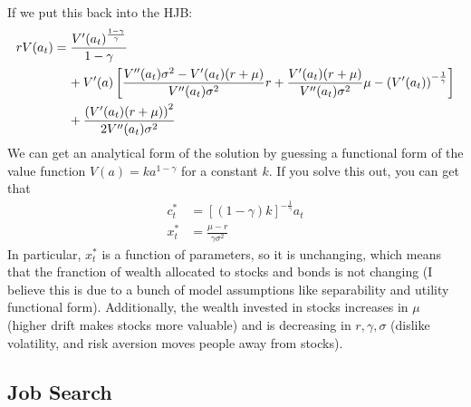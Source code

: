 \documentclass[12pt]{article}
\begin{document}
\begin{itemize}
\[\begin{split}
    \end{split}\]
    If we put this back into the HJB:
    \[\begin{split}
        rV(a_t) &= \frac{V'(a_t)^{\frac{1-\gamma}{\gamma}}}{1-\gamma}\\
        &\hspace{4mm}+ V'(a)\left[\frac{V''(a_t)\sigma^2-V'(a_t)(r+\mu)}{V''(a_t)\sigma^2}r +\frac{V'(a_t)(r+\mu)}{V''(a_t)\sigma^2}\mu -\left(V'(a_t)\right)^{-\frac{1}{\gamma}} \right]\\
        &\hspace{4mm}+ \frac{\left(V'(a_t)(r+\mu)\right)^2}{2V''(a_t)\sigma^2}
    \end{split}\]
    We can get an analytical form of the solution by guessing a functional form of the value function $V(a) = ka^{1-\gamma}$ for a constant $k$. If you solve this out, you can get that
    \[\begin{split}
        c_t^* &= \left[(1-\gamma)k\right]^{-\frac{1}{\gamma}}a_t \\
        x_t^* &= \frac{\mu - r}{\gamma \sigma^2}
    \end{split}\]
    In particular, $x_t^*$ is a function of parameters, so it is unchanging, which means that the franction of wealth allocated to stocks and bonds is not changing (I believe this is due to a bunch of model assumptions like separability and utility functional form). Additionally, the wealth invested in stocks increases in $\mu$ (higher drift makes stocks more valuable) and is decreasing in $r,\gamma,\sigma$ (dislike volatility, and risk aversion moves people away from stocks).
\end{itemize}

\subsection{Job Search}
\end{document}

